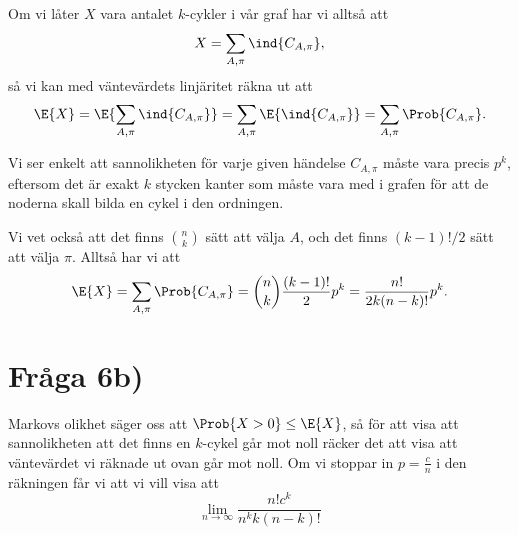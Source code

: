 \documentclass[nobib]{tufte-handout}
\begin{document}
Om vi låter $X$ vara antalet $k$-cykler i vår graf har vi alltså att
$$X = \sum_{A, \pi} \ind{C_{A,\pi}},$$
så vi kan med väntevärdets linjäritet räkna ut att
$$\E{X} = \E{\sum_{A, \pi} \ind{C_{A,\pi}}} = \sum_{A, \pi} \E{\ind{C_{A,\pi}}} = \sum_{A, \pi} \Prob{C_{A,\pi}}.$$

Vi ser enkelt att sannolikheten för varje given händelse $C_{A,\pi}$ måste vara precis $p^k$, eftersom det är exakt $k$ stycken kanter som måste vara med i grafen för att de noderna skall bilda en cykel i den ordningen.

Vi vet också att det finns $n \choose k$ sätt att välja $A$, och det finns $(k-1)!/2$ sätt att välja $\pi$. Alltså har vi att
$$\E{X} = \sum_{A, \pi} \Prob{C_{A,\pi}} = {n \choose k}\frac{(k-1)!}{2}p^k = \frac{n!}{2 k (n-k)!} p^k.$$

\section{Fråga 6b)}

Markovs olikhet säger oss att $\Prob{X > 0} \leq \E{X}$, så för att visa att sannolikheten att det finns en $k$-cykel går mot noll räcker det att visa att väntevärdet vi räknade ut ovan går mot noll. Om vi stoppar in $p = \frac{c}{n}$ i den räkningen får vi att vi vill visa att
$$\lim_{n \to \infty} \frac{n! c^k}{n^k k (n-k)!}$$

%
%
\end{document}
